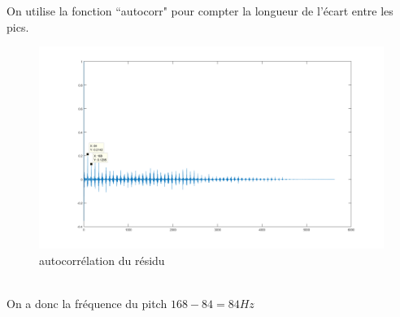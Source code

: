 \documentclass{article}
\begin{document}
On utilise la fonction ``autocorr" pour compter la longueur de l'\'ecart entre les pics. 
\begin{figure}[!h] 
\begin{center}
\includegraphics[scale=0.25]{autocorr.png}
\caption{autocorr\'elation du r\'esidu}
\end{center}
\end{figure}
\\On a donc la fr\'equence du pitch $168-84=84Hz$
\end{document}
